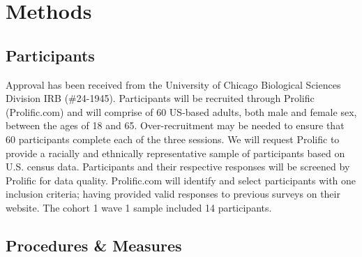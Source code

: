 \documentclass[
  man,
  floatsintext,
  longtable,
  nolmodern,
  notxfonts,
  notimes,
  colorlinks=true,linkcolor=blue,citecolor=blue,urlcolor=blue]{apa7}
\begin{document}
\section{Methods}\label{methods}

\subsection{Participants}\label{participants}

Approval has been received from the University of Chicago Biological
Sciences Division IRB (\#24-1945). Participants will be recruited
through Prolific (Prolific.com) and will comprise of 60 US-based adults,
both male and female sex, between the ages of 18 and 65.
Over-recruitment may be needed to ensure that 60 participants complete
each of the three sessions. We will request Prolific to provide a
racially and ethnically representative sample of participants based on
U.S. census data. Participants and their respective responses will be
screened by Prolific for data quality. Prolific.com will identify and
select participants with one inclusion criteria; having provided valid
responses to previous surveys on their website. The cohort 1 wave 1
sample included 14 participants.

\subsection{Procedures \& Measures}\label{procedures-measures}
\end{document}
